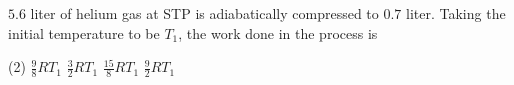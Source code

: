 
\item $5.6$ liter of helium gas at STP is adiabatically compressed to $0.7$ liter. Taking the initial temperature to be $T_1$, the work done in the process is
    \begin{tasks}(2)
        \task $\frac{9}{8} R T_1$
        \task $\frac{3}{2} R T_1$
        \task $\frac{15}{8} R T_1$
        \task $\frac{9}{2} R T_1$
    \end{tasks}
